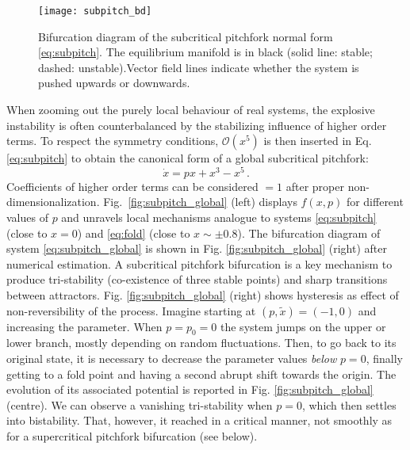 \begin{figure}[h!]
	\centering
	\texttt{[image: subpitch\_bd]}
	\caption{\small Bifurcation diagram of the subcritical pitchfork normal form \ref{eq:subpitch}. The equilibrium manifold is in black (solid line: stable; dashed: unstable).Vector field lines indicate whether the system is pushed upwards or downwards. }
	\label{fig:subpitch_diagram_bif}
\end{figure}



When zooming out the purely local behaviour of real systems, the explosive instability is often counterbalanced by the stabilizing influence of higher order terms. To respect the symmetry conditions, $\mathcal{O}(x^5)$ is then inserted in Eq. \ref{eq:subpitch} to obtain the canonical form of a global subcritical pitchfork:
\begin{equation}
	\dot{x} = px +x^3 -x^5 \, .
	\label{eq:subpitch_global}
\end{equation}
Coefficients of higher order terms can be considered $=1$ after proper non-dimensionalization. Fig.~\ref{fig:subpitch_global} (left) displays $f(x,p)$ for different values of $p$ and unravels local mechanisms analogue to systems \ref{eq:subpitch} (close to $x=0$) and \ref{eq:fold} (close to $x \sim \pm 0.8$). The bifurcation diagram of system \ref{eq:subpitch_global} is shown in Fig. \ref{fig:subpitch_global} (right) after numerical estimation. A subcritical pitchfork bifurcation is a key mechanism to produce tri-stability (co-existence of three stable points) and sharp transitions between attractors. Fig. \ref{fig:subpitch_global} (right) shows hysteresis as effect of non-reversibility of the process. Imagine starting at $(p,\tilde{x})=(-1,0)$ and increasing the parameter. When $p=p_0=0$ the system jumps on the upper or lower branch, mostly depending on random fluctuations. Then, to go back to its original state, it is necessary to decrease the parameter values \textit{below} $p=0$, finally getting to a fold point and having a second abrupt shift towards the origin. The evolution of its associated potential is reported in Fig. \ref{fig:subpitch_global} (centre). We can observe a vanishing tri-stability when $p=0$, which then settles into bistability. That, however, it reached in a critical manner, not smoothly as for a supercritical pitchfork bifurcation (see below).


